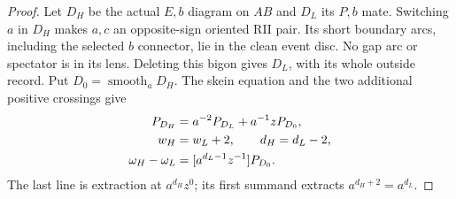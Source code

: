 \begin{proof}
Let $D_H$ be the actual $E,b$ diagram on $AB$ and $D_L$ its $P,b$
mate. Switching $a$ in $D_H$ makes $a,c$ an opposite-sign oriented
RII pair. Its short boundary arcs, including the selected $b$
connector, lie in the clean event disc. No gap arc or spectator is
in its lens. Deleting this bigon gives $D_L$, with its whole outside
record. Put $D_0=\operatorname{smooth}_aD_H$. The skein equation
and the two additional positive crossings give
\begin{align}
 P_{D_H}&=a^{-2}P_{D_L}+a^{-1}zP_{D_0},\notag\\
 w_H&=w_L+2,\qquad d_H=d_L-2,\notag\\
 \omega_H-\omega_L&=[a^{d_L-1}z^{-1}]P_{D_0}.
 \label{rtr:generic-skein}
\end{align}
The last line is extraction at $a^{d_H}z^0$; its first summand
extracts $a^{d_H+2}=a^{d_L}$.


\end{proof}
